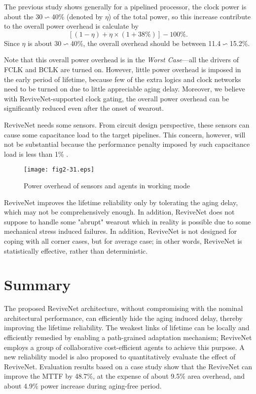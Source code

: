 The previous study \cite{clockpower_02} shows generally for a pipelined processor,
the clock power is about the 30$\backsim$40\% (denoted by $\eta$) of the total power,
so this increase contribute to the overall power overhead is calculate by
$$[(1-\eta) + \eta \times (1+38\%)] - 100\%.$$
Since $\eta$ is about 30$\backsim$40\%, the overall overhead should be between 11.4$\backsim$15.2\%.

Note that this overall power overhead is in the \emph{Worst Case}---all the drivers of FCLK and BCLK
are turned on. However, little power overhead is imposed in the early period of lifetime, because
few of the extra logics and clock networks need to be turned on due to  little appreciable aging
delay. Moreover, we believe with ReviveNet-supported clock gating, the overall power
overhead can be significantly reduced even after the onset of wearout.



\smallskip {}

ReviveNet needs some sensors. From circuit design perspective, these sensors can cause some
capacitance load to the target pipelines. This concern, however, will not be substantial because
the performance penalty imposed by such capacitance load is less than 1\%
\cite{failure_prediction_07}\cite{SVFD_09}.


\begin{figure}[t]
\centering
\texttt{[image: fig2-31.eps]}%
\vspace{-0.3cm}
   \caption{Power overhead of sensors and agents in working mode}\label{logicpower}
\end{figure}

ReviveNet improves the lifetime reliability only by tolerating the aging delay, which may not be
comprehensively enough. In addition, ReviveNet does not suppose to handle some "abrupt" wearout
which in reality is possible due to some mechanical stress induced failures.
In addition, ReviveNet is not designed for coping with all corner cases, but for average case;
in other words, ReviveNet is statistically effective, rather than deterministic.

\section{Summary}
The proposed ReviveNet architecture, without compromising with the nominal architectural
performance, can efficiently hide the aging induced delay, thereby improving the lifetime
reliability. The weakest links of lifetime can be locally and efficiently remedied by enabling a
path-grained adaptation mechanism; ReviveNet employs a group of collaborative cost-efficient agents
to achieve this purpose. A new reliability model is also proposed to quantitatively evaluate the
effect of ReviveNet. Evaluation results based on a case study show that the ReviveNet can improve
the MTTF by 48.7\%, at the expense of about 9.5\% area overhead, and about 4.9\% power increase during aging-free period.



